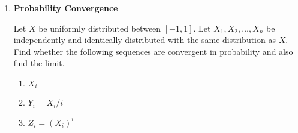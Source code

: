 \documentclass[11pt, a4paper]{article}
\begin{document}
\begin{enumerate}
    \item \hypertarget{q_convergence}{\textbf{Probability Convergence}}\newline
    Let $X$ be uniformly distributed between $[-1,1]$. Let $X_{1}, X_{2},\ldots,X_{n}$ be independently and identically distributed with the same distribution as $X$. Find whether the following sequences are convergent in probability and also find the limit.
    \begin{enumerate}
        \item $X_{i}$
        \item $Y_{i} = X_{i}/i$
        \item $Z_{i} = (X_{i})^{i}$
    \end{enumerate}

    \end{enumerate}
\end{document}
